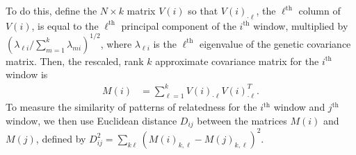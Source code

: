\documentclass[11pt, oneside]{article}   	%
\begin{document}
To do this, define the $N \times k$ matrix $V(i)$ so that $V(i)_{\cdot \ell}$, 
the $\ell^\text{th}$ column of $V(i)$,
is equal to the $\ell^\text{th}$ principal component of the $i^\text{th}$ window,
multiplied by $( \lambda_{\ell i} / \sum_{m=1}^k \lambda_{m i} )^{1/2}$,
where $\lambda_{\ell i}$ is the $\ell^\text{th}$ eigenvalue of the genetic covariance matrix.
Then, the rescaled, rank $k$ approximate covariance matrix for the $i^\text{th}$ window is
\begin{align} \label{eqn:est_cov}
    M(i) &= \sum_{\ell=1}^k V(i)_{\cdot \ell} V(i)_{\cdot \ell}^T .
\end{align}
To measure the similarity of patterns of relatedness for the $i^\text{th}$ window and $j^\text{th}$ window,
we then use
Euclidean distance $D_{ij}$ between the matrices $M(i)$ and $M(j)$,
defined by
$D_{ij}^2 = \sum_{k\ell} ( M(i)_{k,\ell} - M(j)_{k,\ell} )^2$.
\end{document}
